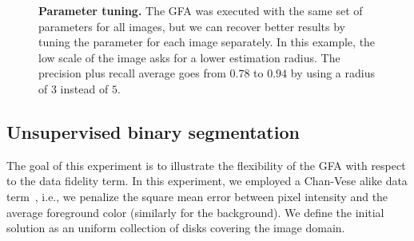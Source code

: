 \documentclass[review]{siamart220329}
\begin{document}
\begin{figure}
\center
{}\hspace{1em}
\caption{\textbf{Parameter tuning.} The GFA was executed with the same set of
parameters for all images, but we can recover better results by tuning the
parameter for each image separately. In this example, the low scale of the
image asks for a lower estimation radius. The precision plus recall average
goes from $0.78$ to $0.94$ by using a radius of $3$ instead of $5$. }
\label{fig:coco-parameter-tuning}
\end{figure}
%
%
\subsection{Unsupervised binary segmentation}
The goal of this experiment is to illustrate the flexibility of the GFA with
respect to the data fidelity term. In this experiment, we employed a Chan-Vese
alike data term~\cite{chan01}, i.e., we penalize the square mean error between
pixel intensity and the average foreground color (similarly for the background).
We define the initial solution as an uniform collection of disks covering the
image domain.
\end{document}
